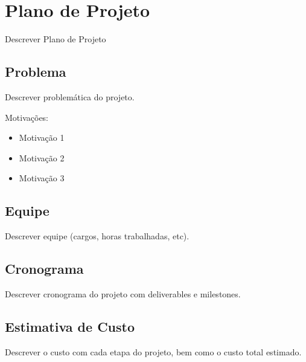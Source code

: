 \section{Plano de Projeto}

Descrever Plano de Projeto

\subsection{Problema}

Descrever problemática do projeto.

Motivações:

\begin{itemize}
\item Motivação 1
\item Motivação 2
\item Motivação 3
\end{itemize}

\subsection{Equipe}

Descrever equipe (cargos, horas trabalhadas, etc).

\subsection{Cronograma}

Descrever cronograma do projeto com deliverables e milestones.

\subsection{Estimativa de Custo}

Descrever o custo com cada etapa do projeto, bem como o custo total estimado.
